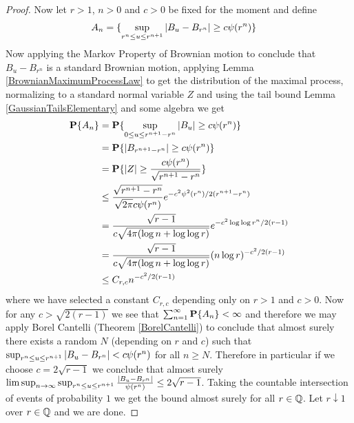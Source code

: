 \begin{proof}
Now let $r > 1$, $n > 0$ and $c > 0$ be fixed for the moment and define
\begin{align*}
A_n &= \lbrace \sup_{r^n \leq u \leq r^{n+1}} \left \vert B_u - B_{r^n} \right \vert \geq
  c \psi(r^n) \rbrace
\end{align*}
Now applying the Markov Property of Brownian motion to conclude that $B_u
- B_{r^n}$ is a standard Brownian motion,   applying Lemma
\ref{BrownianMaximumProcessLaw} to get the distribution of the maximal
process, normalizing to a standard normal variable $Z$ and using the
tail bound Lemma \ref{GaussianTailsElementary} and some algebra we get
\begin{align*}
\textbf{P}\{A_n\} 
&= \textbf{P}\{\sup_{0\leq u \leq r^{n+1} - r^n}
    \left \vert B_{u} \right \vert \geq  c \psi(r^n)\} \\
&= \textbf{P}\{\left \vert B_{r^{n+1} - r^n} \right \vert \geq  c \psi(r^n)\} \\
&= \textbf{P}\{\left \vert Z \right \vert \geq  \frac{c
    \psi(r^n)}{\sqrt{r^{n+1} - r^n}}\} \\
&\leq \frac{\sqrt{r^{n+1} - r^n}}{\sqrt{2 \pi} c\psi(r^n)} e^{-c^2
  \psi^2(r^n)/2(r^{n+1} -r^n)} \\
&= \frac{\sqrt{r - 1}}{c \sqrt{4 \pi (\log n + \log \log r) } } e^{-c^2
  \log \log r^n/2(r -1)} \\
&= \frac{\sqrt{r - 1}}{c \sqrt{4 \pi (\log n + \log \log r) } } (n
\log r)^{-c^2/2(r -1)} \\
&\leq C_{r,c} n^{-c^2/2(r -1)}
\end{align*}
where we have selected a constant $C_{r,c}$ depending only on $r>1$
and $c > 0$.  Now for any $c > \sqrt{2(r-1)}$ we see that
$\sum_{n=1}^\infty \textbf{P}\{A_n\} < \infty$ and therefore we may
apply Borel Cantelli (Theorem \ref{BorelCantelli}) to conclude that
almost surely there exists a random $N$ (depending on $r$ and $c$) such that $\sup_{r^n \leq u \leq r^{n+1}} \left \vert B_u - B_{r^n} \right \vert <
  c \psi(r^n)$ for all $n \geq N$.  Therefore in particular if we
  choose $c = 2\sqrt{r-1}$ we conclude that
  almost surely
  $\limsup_{n \to \infty} \sup_{r^n \leq u \leq r^{n+1}}
  \frac{\left \vert B_u - B_{r^n} \right \vert }{\psi(r^n)} \leq 2\sqrt{r-1}$.  Taking
  the countable intersection of events of probability $1$  we get the
  bound almost surely for all $r \in
  \mathbb{Q}$.  Let $r \downarrow 1$ over $r \in \mathbb{Q}$ and we are done.
\end{proof}

